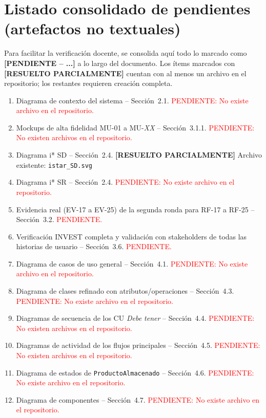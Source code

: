 \documentclass[11pt,a4paper]{article}
\newcommand{\PENDIENTE}[1]{\textcolor{pendiente}{\textbf{[PENDIENTE -- #1]}}}
\begin{document}
\section{Listado consolidado de pendientes (artefactos no textuales)}
Para facilitar la verificación docente, se consolida aquí todo lo marcado como \PENDIENTE{...} a lo largo del documento. Los ítems marcados con \textbf{[RESUELTO PARCIALMENTE]} cuentan con al menos un archivo en el repositorio; los restantes requieren creación completa.
\begin{enumerate}[nosep]
\item Diagrama de contexto del sistema -- Sección~2.1. \textcolor{red}{PENDIENTE: No existe archivo en el repositorio.}
\item Mockups de alta fidelidad MU-01 a MU-\textit{XX} -- Sección~3.1.1. \textcolor{red}{PENDIENTE: No existen archivos en el repositorio.}
\item Diagrama i* SD -- Sección~2.4. \textbf{[RESUELTO PARCIALMENTE]} Archivo existente: \texttt{istar\_SD.svg}
\item Diagrama i* SR -- Sección~2.4. \textcolor{red}{PENDIENTE: No existe archivo en el repositorio.}
\item Evidencia real (EV-17 a EV-25) de la segunda ronda para RF-17 a RF-25 -- Sección~3.2. \textcolor{red}{PENDIENTE.}
\item Verificación INVEST completa y validación con stakeholders de todas las historias de usuario -- Sección~3.6. \textcolor{red}{PENDIENTE.}
\item Diagrama de casos de uso general -- Sección~4.1. \textcolor{red}{PENDIENTE: No existe archivo en el repositorio.}
\item Diagrama de clases refinado con atributos/operaciones -- Sección~4.3. \textcolor{red}{PENDIENTE: No existe archivo en el repositorio.}
\item Diagramas de secuencia de los CU \textit{Debe tener} -- Sección~4.4. \textcolor{red}{PENDIENTE: No existen archivos en el repositorio.}
\item Diagramas de actividad de los flujos principales -- Sección~4.5. \textcolor{red}{PENDIENTE: No existen archivos en el repositorio.}
\item Diagrama de estados de \texttt{ProductoAlmacenado} -- Sección~4.6. \textcolor{red}{PENDIENTE: No existe archivo en el repositorio.}
\item Diagrama de componentes -- Sección~4.7. \textcolor{red}{PENDIENTE: No existe archivo en el repositorio.}

\end{enumerate}
\end{document}
